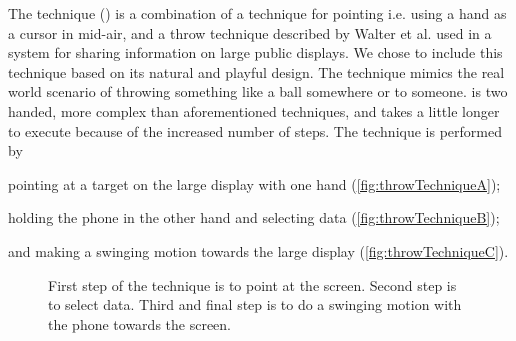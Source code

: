 The \throw technique () is a combination of a technique for pointing \cite{Scheible:2008} i.e. using a hand as a cursor in mid-air, and a throw technique described by Walter et al. \cite{Walter:2014} used in a system for sharing information on large public displays.
We chose to include this technique based on its natural and playful design.
The technique mimics the real world scenario of throwing something like a ball somewhere or to someone.
\throw is two handed, more complex than aforementioned techniques, and takes a little longer to execute because of the increased number of steps.
The \throw technique is performed by 
\begin{enumerate*}[label=\itshape\roman*\upshape)]
	\item{pointing at a target on the large display with one hand (\cref{fig:throwTechniqueA});}
	\item{holding the phone in the other hand and selecting data (\cref{fig:throwTechniqueB});}
	\item{and making a swinging motion towards the large display (\cref{fig:throwTechniqueC}).}
\end{enumerate*}

\begin{figure}[H]
\caption{\protect{} First step of the \throw technique is to point at the screen. \protect{} Second step is to select data. \protect{} Third and final step is to do a swinging motion with the phone towards the screen.}
\label{fig:throwTechnique}
\end{figure}

